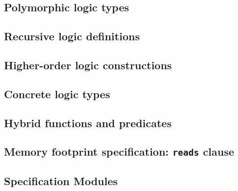 
\subsection{Polymorphic logic types}
\absent


\subsection{Recursive logic definitions}
\nodiff


\subsection{Higher-order logic constructions}
\absent


\subsection{Concrete logic types}
\absent


\subsection{Hybrid functions and predicates}
\label{sec:logicalstates}
\nodiff


\subsection{Memory footprint specification: \texorpdfstring{\lstinline|reads|}{reads} clause}
\absent


\subsection{Specification Modules}
\label{sec:specmodules}
\absent

